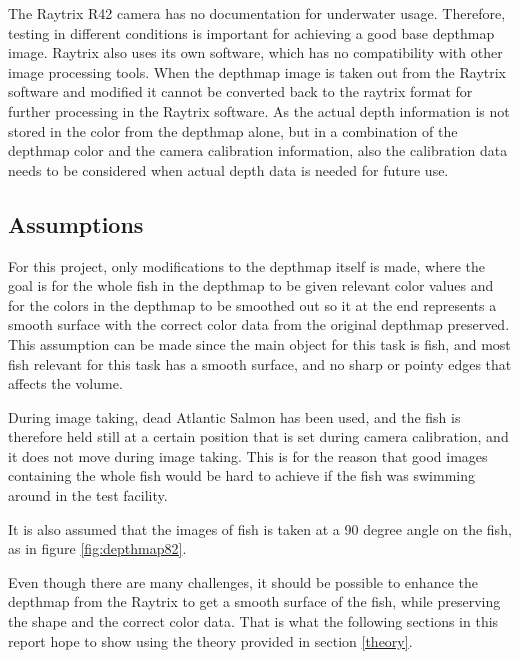 The Raytrix R42 camera has no documentation for underwater usage. Therefore, testing in different conditions is important for achieving a good base depthmap image. Raytrix also uses its own software, which has no compatibility with other image processing tools. When the depthmap image is taken out from the Raytrix software and modified it cannot be converted back to the raytrix format for further processing in the Raytrix software. As the actual depth information is not stored in the color from the depthmap alone, but in a combination of the depthmap color and the camera calibration information, also the calibration data needs to be considered when actual depth data is needed for future use. 



\subsection{Assumptions}

For this project, only modifications to the depthmap itself is made, where the goal is for the whole fish in the depthmap to be given relevant color values and for the colors in the depthmap to be smoothed out so it at the end represents a smooth surface with the correct color data from the original depthmap preserved. This assumption can be made since the main object for this task is fish, and most fish relevant for this task has a smooth surface, and no sharp or pointy edges that affects the volume. 

During image taking, dead Atlantic Salmon has been used, and the fish is therefore held still at a certain position that is set during camera calibration, and it does not move during image taking. This is for the reason that good images containing the whole fish would be hard to achieve if the fish was swimming around in the test facility.

It is also assumed that the images of fish is taken at a 90 degree angle on the fish, as in figure \ref{fig:depthmap82}.

Even though there are many challenges, it should be possible to enhance the depthmap from the Raytrix to get a smooth surface of the fish, while preserving the shape and the correct color data. That is what the following sections in this report hope to show using the theory provided in section \ref{theory}.